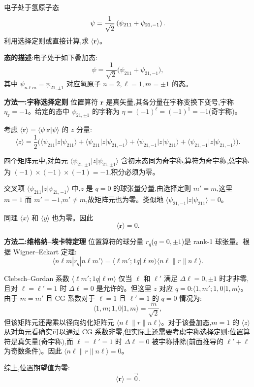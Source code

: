 \begin{question}
电子处于氢原子态
\[
\psi={1\over\sqrt2}\left(\psi_{211}+\psi_{21,-1}\right).
\]
利用选择定则或直接计算,求 $\langle\mathbf r\rangle$。
\end{question}
\begin{solution}
	\textbf{态的描述}:电子处于如下叠加态:
	\[
	\psi = \frac{1}{\sqrt{2}}\big(\psi_{211}+\psi_{21,-1}\big),
	\]
	其中 $\psi_{n\ell m}=\psi_{21,\pm1}$ 对应氢原子 $n=2,\ell=1,m=\pm1$ 的态。

	\textbf{方法一:宇称选择定则} 位置算符 $\mathbf r$ 是真矢量,其各分量在宇称变换下变号,宇称 $\eta_\mathbf r=-1$。给定的态中 $\psi_{21,\pm1}$ 的宇称为 $\eta=(-1)^\ell=(-1)^1=-1$(奇宇称)。

	考虑 $\langle \mathbf r\rangle = \langle \psi|\mathbf r|\psi\rangle$ 的 $z$ 分量:
	\[
	\langle z\rangle = \frac12\big(\langle\psi_{211}|z|\psi_{211}\rangle
	+ \langle\psi_{211}|z|\psi_{21,-1}\rangle
	+ \langle\psi_{21,-1}|z|\psi_{211}\rangle
	+ \langle\psi_{21,-1}|z|\psi_{21,-1}\rangle\big).
	\]

	四个矩阵元中,对角元 $\langle\psi_{21,\pm1}|z|\psi_{21,\pm1}\rangle$ 含初末态同为奇宇称,算符为奇宇称,总宇称为 $(-1)\times(-1)\times(-1) = -1$,积分必须为零。

	交叉项 $\langle\psi_{211}|z|\psi_{21,-1}\rangle$ 中,$z$ 是 $q=0$ 的球张量分量,由选择定则 $m'=m$,这里 $m=1$ 而 $m'=-1$,$m'\neq m$,故矩阵元也为零。类似地 $\langle\psi_{21,-1}|z|\psi_{211}\rangle=0$。

	同理 $\langle x\rangle$ 和 $\langle y\rangle$ 也为零。因此
	\[
	\boxed{\langle \mathbf r\rangle = 0}.
	\]

	\textbf{方法二:维格纳--埃卡特定理} 位置算符的球分量 $r_q$($q=0,\pm1$)是 rank-1 球张量。根据 Wigner--Eckart 定理:
	\[
	\langle n\ell m|r_q|n\ell m'\rangle = \langle \ell m';1q|\ell m\rangle\langle n\ell\|r\|n\ell\rangle.
	\]

	Clebsch--Gordan 系数 $\langle \ell m';1q|\ell m\rangle$ 仅当 $\ell$ 和 $\ell'$ 满足 $\Delta\ell=0,\pm1$ 时才非零,且对 $\ell=\ell'=1$ 时 $\Delta\ell=0$ 是允许的。但这里 $z$ 对应 $q=0$:$\langle 1,m';1,0|1,m\rangle$。由于 $m=m'$ 且 CG 系数对于 $\ell=1$ 且 $\ell'=1$ 的 $q=0$ 情况为:
	\[
	\langle 1,m;1,0|1,m\rangle = \frac{m}{\sqrt{2}},
	\]
	但该矩阵元还需乘以径向约化矩阵元 $\langle n\ell\|r\|n\ell\rangle$。对于该叠加态,$m=1$ 的 $\langle z\rangle$ 从对角元看确实可以通过 CG 系数非零,但实际上还需要考虑宇称选择定则:位置算符是真矢量(奇宇称),而 $\ell=\ell'=1$ 时 $\Delta\ell=0$ 被宇称排除(前面推导的 $\ell'+\ell$ 为奇数条件)。因此 $\langle n\ell\|r\|n\ell\rangle = 0$。

	综上,位置期望值为零:
	\[
	\boxed{\langle \mathbf r\rangle = \vec 0}.
	\]
	\end{solution}

